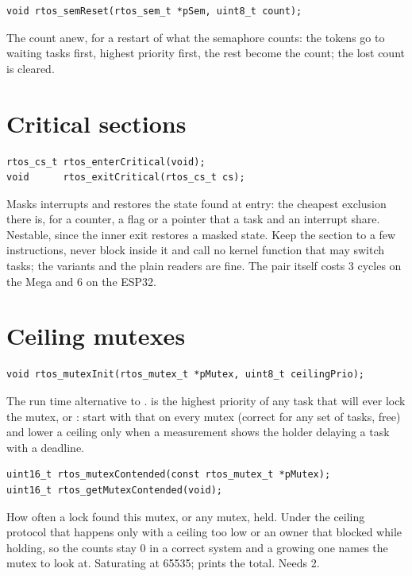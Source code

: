 \begin{lstlisting}
void rtos_semReset(rtos_sem_t *pSem, uint8_t count);
\end{lstlisting}
The count anew, for a restart of what the semaphore counts: the tokens go to waiting
tasks first, highest priority first, the rest become the count; the lost count is cleared.

\section{Critical sections}

\begin{lstlisting}
rtos_cs_t rtos_enterCritical(void);
void      rtos_exitCritical(rtos_cs_t cs);
\end{lstlisting}
Masks interrupts and restores the state found at entry: the cheapest exclusion there is,
for a counter, a flag or a pointer that a task and an interrupt share. Nestable, since the
inner exit restores a masked state. Keep the section to a few instructions, never block
inside it and call no kernel function that may switch tasks; the  variants
and the plain readers are fine. The pair itself costs 3 cycles on the Mega and 6 on the
ESP32.

\section{Ceiling mutexes}

\begin{lstlisting}
void rtos_mutexInit(rtos_mutex_t *pMutex, uint8_t ceilingPrio);
\end{lstlisting}
The run time alternative to .  is the highest
priority of any task that will ever lock the mutex, or :
start with that on every mutex (correct for any set of tasks, free) and lower a ceiling
only when a measurement shows the holder delaying a task with a deadline.

\begin{lstlisting}
uint16_t rtos_mutexContended(const rtos_mutex_t *pMutex);
uint16_t rtos_getMutexContended(void);
\end{lstlisting}
How often a lock found this mutex, or any mutex, held. Under the ceiling protocol that
happens only with a ceiling too low or an owner that blocked while holding, so the counts
stay 0 in a correct system and a growing one names the mutex to look at. Saturating at
65535;  prints the total. Needs  2.


